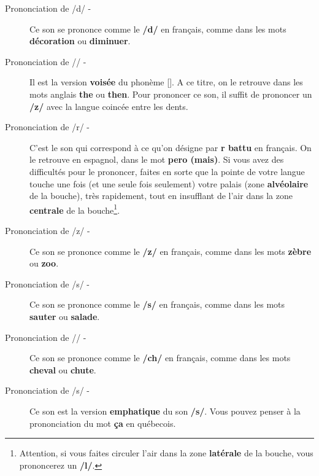 \begin{description}
    \item[Prononciation de  /d/ -] 
    
    Ce son se prononce comme le \textbf{/d/} en français, comme dans les mots \textbf{décoration} ou \textbf{diminuer}.

    \item[Prononciation de  /\dh/ -] 
    
    Il est la version \textbf{voisée} du phonème  [\texttheta]. A ce titre, on le retrouve dans les mots anglais \textbf{the} ou \textbf{then}. Pour prononcer ce son, il suffit de prononcer un \textbf{/z/} avec la langue coincée entre les dents.

    \item[Prononciation de  /r/ -]
    
    C'est le son qui correspond à ce qu'on désigne par \textbf{r battu} en français. On le retrouve en espagnol, dans le mot \textbf{pero (mais)}. Si vous avez des difficultés pour le prononcer, faites en sorte que la pointe de votre langue touche une fois (et une seule fois seulement) votre palais (zone \textbf{alvéolaire} de la bouche), très rapidement, tout en insufflant de l'air dans la zone \textbf{centrale} de la bouche\footnote{Attention, si vous faites circuler l'air dans la zone \textbf{latérale} de la bouche, vous prononcerez un \textbf{/l/}.}.

    \item[Prononciation de  /z/ -] 
    
    Ce son se prononce comme le \textbf{/z/} en français, comme dans les mots \textbf{zèbre} ou \textbf{zoo}.

    \item[Prononciation de  /s/ -]

    Ce son se prononce comme le \textbf{/s/} en français, comme dans les mots \textbf{sauter} ou \textbf{salade}.

    \item[Prononciation de  /\textesh/ -]

    Ce son se prononce comme le \textbf{/ch/} en français, comme dans les mots \textbf{cheval} ou \textbf{chute}.

    \item[Prononciation de  /s\super \textrevglotstop/ -]

    Ce son est la version \textbf{emphatique} du son \textbf{/s/}. Vous pouvez penser à la prononciation du mot \textbf{ça} en québecois.


\end{description}
